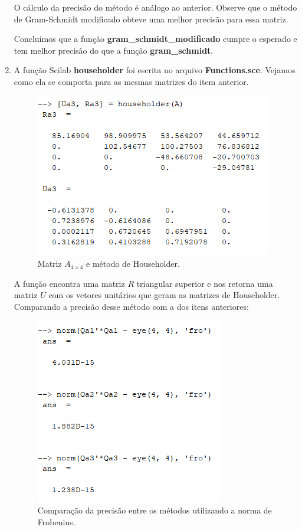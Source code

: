 \documentclass[11pt]{article}
\begin{document}
\begin{enumerate}
            O cálculo da precisão do método é análogo ao anterior. Observe que o método de Gram-Schmidt modificado obteve uma melhor precisão para essa matriz.
            
            Concluímos que a função \textbf{gram\_schmidt\_modificado} cumpre o esperado e tem melhor precisão do que a função \textbf{gram\_schmidt}.
        
        \bigbreak
        
        \item %
        
            A função Scilab \textbf{householder} foi escrita no arquivo \textbf{Functions.sce}. Vejamos como ela se comporta para as mesmas matrizes do item anterior.
        
            \begin{figure}[H]
                \centering
                \includegraphics[]{3-1}
                \caption{Matriz $A_{4\times4}$ e método de Householder.}
            \end{figure}
        
            A função encontra uma matriz $R$ triangular superior e nos retorna uma matriz $U$ com os vetores unitários que geram as matrizes de Householder. Comparando a precisão desse método com a dos itens anteriores:
        
            \begin{figure}[H]
                \centering
                \includegraphics[]{3-2}
                \caption{Comparação da precisão entre os métodos utilizando a norma de Frobenius.}
            \end{figure}
            

\end{enumerate}
\end{document}
